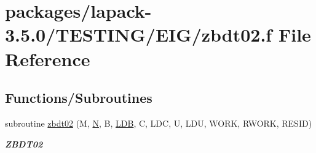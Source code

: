 \hypertarget{zbdt02_8f}{}\section{packages/lapack-\/3.5.0/\+T\+E\+S\+T\+I\+N\+G/\+E\+I\+G/zbdt02.f File Reference}
\label{zbdt02_8f}
\subsection*{Functions/\+Subroutines}
\begin{DoxyCompactItemize}
\item 
subroutine \hyperlink{group__complex16__eig_gae2e86e0081ec0a0bd76bad8463394dc5}{zbdt02} (M, \hyperlink{polmisc_8c_a0240ac851181b84ac374872dc5434ee4}{N}, B, \hyperlink{example__user_8c_a50e90a7104df172b5a89a06c47fcca04}{L\+D\+B}, C, L\+D\+C, U, L\+D\+U, W\+O\+R\+K, R\+W\+O\+R\+K, R\+E\+S\+I\+D)
\begin{DoxyCompactList}\small\item\em {\bfseries Z\+B\+D\+T02} \end{DoxyCompactList}\end{DoxyCompactItemize}
